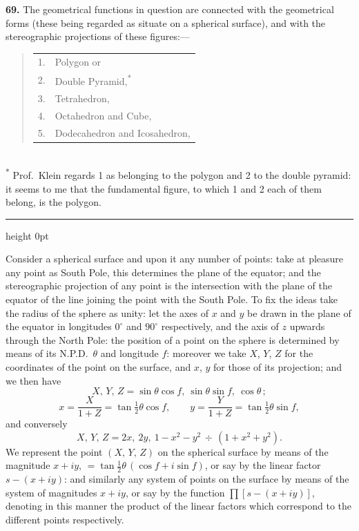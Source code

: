\documentclass[11pt,a4paper]{article}
\newcommand{\artno}[1]{\textbf{#1.}\quad}
\begin{document}
\artno{69} The geometrical functions in question are connected with the
geometrical forms (these being regarded as situate on a spherical surface),
and with the stereographic projections of these figures:---
\begin{quote}
\begin{tabular}{rl}
1.& Polygon or\\
2.& Double Pyramid,\textsuperscript{*}\\
3.& Tetrahedron,\\
4.& Octahedron and Cube,\\
5.& Dodecahedron and Icosahedron,\\
\end{tabular}
\end{quote}

\noindent
\hrulefill\\
\footnotesize\textsuperscript{*} Prof.\ Klein regards 1 as belonging to the
polygon and 2 to the double pyramid: it seems to me that the fundamental
figure, to which 1 and 2 each of them belong, is the polygon.\normalsize

\bigskip
\hrule height 0pt
\bigskip

\noindent
Consider a spherical surface and upon it any number of points: take at
pleasure any point as South Pole, this determines the plane of the equator;
and the stereographic projection of any point is the intersection with the
plane of the equator of the line joining the point with the South Pole. To
fix the ideas take the radius of the sphere as unity: let the axes of $x$
and $y$ be drawn in the plane of the equator in longitudes $0^{\circ}$ and
$90^{\circ}$ respectively, and the axis of $z$ upwards through the North Pole:
the position of a point on the sphere is determined by means of its N.P.D.\
$\theta$ and longitude $f$: moreover we take $X$, $Y$, $Z$ for the
coordinates of the point on the surface, and $x$, $y$ for those of its
projection; and we then have
\[
  X,\,Y,\,Z = \sin\theta\cos f,\ \sin\theta\sin f,\ \cos\theta\,;
\]
\[
  x = \frac{X}{1+Z} = \tan\tfrac{1}{2}\theta\cos f,\qquad
  y = \frac{Y}{1+Z} = \tan\tfrac{1}{2}\theta\sin f,
\]
and conversely
\[
  X,\,Y,\,Z = 2x,\ 2y,\ 1 - x^{2} - y^{2}\,\div\,(1 + x^{2} + y^{2}).
\]
We represent the point $(X,\,Y,\,Z)$ on the spherical surface by means of
the magnitude $x + iy$, $=\tan\tfrac{1}{2}\theta\,(\cos f + i\sin f)$, or say
by the linear factor $s - (x + iy)$: and similarly any system of points on
the surface by means of the system of magnitudes $x + iy$, or say by the
function $\prod[s - (x + iy)]$, denoting in this manner the product of the
linear factors which correspond to the different points respectively.
\end{document}
